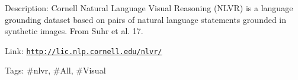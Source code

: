 Description\+: Cornell Natural Language Visual Reasoning (N\+L\+VR) is a language grounding dataset based on pairs of natural language statements grounded in synthetic images. From Suhr et al. \textquotesingle{}17.

Link\+: \href{http://lic.nlp.cornell.edu/nlvr/}{\tt http\+://lic.\+nlp.\+cornell.\+edu/nlvr/}

Tags\+: \#nlvr, \#\+All, \#\+Visual 